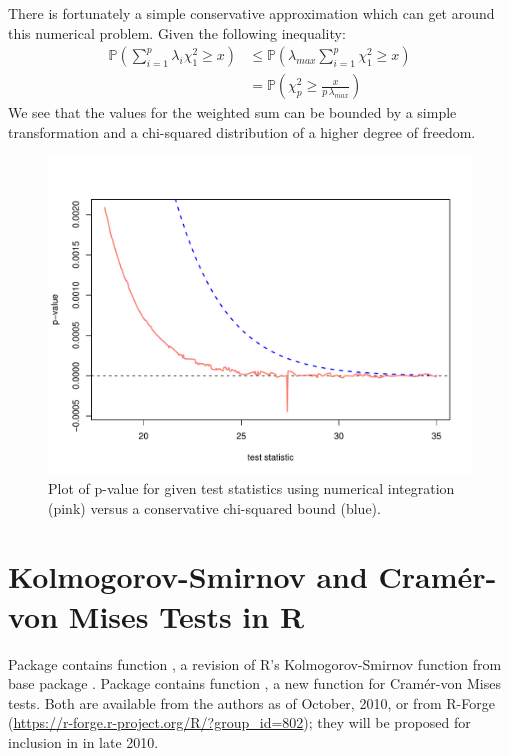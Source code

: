 There is fortunately a simple conservative approximation which can get around this numerical problem. Given the
following inequality:
\begin{align*}
\mathbb{P} \left(\sum_{i=1}^{p} \lambda_i \chi^2_1 \geq x \right) &\leq \mathbb{P} \left( \lambda_{max} \sum_{i=1}^{p} \chi^2_1 \geq x \right) \\
&= \mathbb{P} \left(\chi^2_p \geq \frac{x}{p \, \lambda_{max}} \right)
\end{align*}
We see that the values for the weighted sum can be bounded by a simple transformation and a chi-squared distribution
of a higher degree of freedom. 

\begin{figure}
\begin{center}
\includegraphics[scale=0.4]{fig1.pdf}
\end{center}
\caption{Plot of p-value for given test statistics using numerical integration (pink) versus a conservative
         chi-squared bound (blue). }
\label{cvmissues}
\end{figure}


\section{Kolmogorov-Smirnov and Cram\'{e}r-von Mises Tests in R}

Package  contains function , a revision of
R's Kolmogorov-Smirnov function  from base
package .
Package  contains function , a new
function for Cram\'{e}r-von Mises tests.  Both are available from the authors
as of October, 2010,
or from R-Forge (\url{https://r-forge.r-project.org/R/?group_id=802});
they will be proposed for inclusion in  in late 2010.

